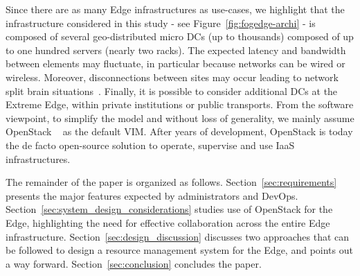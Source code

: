Since there are as many Edge infrastructures as use-cases, we
highlight that the infrastructure considered in this
study - see Figure~\ref{fig:fogedge-archi} - is composed
 of several
geo-distributed micro DCs (up to thousands)
composed of up to one hundred servers (nearly two racks).
The expected latency and bandwidth between elements may fluctuate, in particular because
networks can be wired or wireless. Moreover, disconnections
between sites may occur leading to network split brain
situations~\cite{4456903}. 
Finally, it is possible to consider additional DCs at the Extreme Edge, within private institutions or public transports.
%
From the software viewpoint, to simplify the model and
without loss of generality, we mainly assume OpenStack ~\cite{openstack:www} as the default VIM.  After years of development, OpenStack is today the de facto open-source solution to operate, supervise and use
IaaS infrastructures.

The remainder of the paper is organized as
follows. Section~\ref{sec:requirements} presents the major features
expected by administrators and DevOps. 
Section~\ref{sec:system_design_considerations} studies use of OpenStack for the Edge,
highlighting the need for effective collaboration across the
entire Edge infrastructure. Section~\ref{sec:design_discussion}
discusses two approaches that can be followed to
design a resource management system for the Edge, and points out a way forward. Section~\ref{sec:conclusion} concludes the paper.


